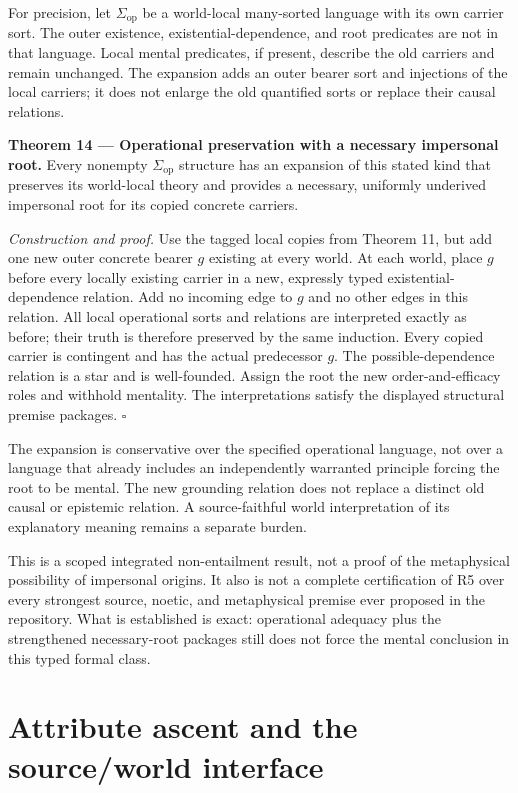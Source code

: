 \documentclass[11pt,a4paper]{article}
\begin{document}
For precision, let \(\Sigma_{\mathrm{op}}\) be a world-local many-sorted
language with its own carrier sort. The outer existence,
existential-dependence, and root predicates are not in that language.
Local mental predicates, if present, describe the old carriers and
remain unchanged. The expansion adds an outer bearer sort and injections
of the local carriers; it does not enlarge the old quantified sorts or
replace their causal relations.


\textbf{Theorem 14 --- Operational preservation with a necessary
impersonal root.} Every nonempty \(\Sigma_{\mathrm{op}}\) structure has
an expansion of this stated kind that preserves its world-local theory
and provides a necessary, uniformly underived impersonal root for its
copied concrete carriers.

\emph{Construction and proof.} Use the tagged local copies from Theorem
11, but add one new outer concrete bearer \(g\) existing at every world.
At each world, place \(g\) before every locally existing carrier in a
new, expressly typed existential-dependence relation. Add no incoming
edge to \(g\) and no other edges in this relation. All local operational
sorts and relations are interpreted exactly as before; their truth is
therefore preserved by the same induction. Every copied carrier is
contingent and has the actual predecessor \(g\). The possible-dependence
relation is a star and is well-founded. Assign the root the new
order-and-efficacy roles and withhold mentality. The interpretations
satisfy the displayed structural premise packages. \(\square\)

The expansion is conservative over the specified operational language,
not over a language that already includes an independently warranted
principle forcing the root to be mental. The new grounding relation does
not replace a distinct old causal or epistemic relation. A
source-faithful world interpretation of its explanatory meaning remains
a separate burden.

This is a scoped integrated non-entailment result, not a proof of the
metaphysical possibility of impersonal origins. It also is not a
complete certification of R5 over every strongest source, noetic, and
metaphysical premise ever proposed in the repository. What is
established is exact: operational adequacy plus the strengthened
necessary-root packages still does not force the mental conclusion in
this typed formal class.

\section{Attribute ascent and the source/world
interface}\label{attribute-ascent-and-the-sourceworld-interface}
\end{document}
